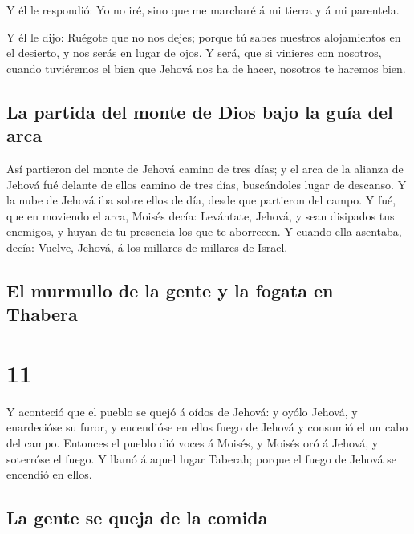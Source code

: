  Y él le respondió: Yo no iré, sino que me marcharé á mi
tierra y á mi parentela.

 Y él le dijo: Ruégote que no nos dejes; porque tú sabes
nuestros alojamientos en el desierto, y nos serás en lugar de ojos.
 Y será, que si vinieres con nosotros, cuando tuviéremos
el bien que Jehová nos ha de hacer, nosotros te haremos bien.

\hypertarget{la-partida-del-monte-de-dios-bajo-la-guuxeda-del-arca}{%
\subsection{La partida del monte de Dios bajo la guía del
arca}\label{la-partida-del-monte-de-dios-bajo-la-guuxeda-del-arca}}

 Así partieron del monte de Jehová camino de tres días; y
el arca de la alianza de Jehová fué delante de ellos camino de tres
días, buscándoles lugar de descanso.  Y la nube de Jehová
iba sobre ellos de día, desde que partieron del campo.  Y
fué, que en moviendo el arca, Moisés decía: Levántate, Jehová, y sean
disipados tus enemigos, y huyan de tu presencia los que te aborrecen.
 Y cuando ella asentaba, decía: Vuelve, Jehová, á los
millares de millares de Israel.

\hypertarget{el-murmullo-de-la-gente-y-la-fogata-en-thabera}{%
\subsection{El murmullo de la gente y la fogata en
Thabera}\label{el-murmullo-de-la-gente-y-la-fogata-en-thabera}}

\hypertarget{section-10}{%
\section{11}\label{section-10}}

 Y aconteció que el pueblo se quejó á oídos de Jehová: y
oyólo Jehová, y enardecióse su furor, y encendióse en ellos fuego de
Jehová y consumió el un cabo del campo.  Entonces el
pueblo dió voces á Moisés, y Moisés oró á Jehová, y soterróse el fuego.
 Y llamó á aquel lugar Taberah; porque el fuego de Jehová
se encendió en ellos.

\hypertarget{la-gente-se-queja-de-la-comida}{%
\subsection{La gente se queja de la
comida}\label{la-gente-se-queja-de-la-comida}}

